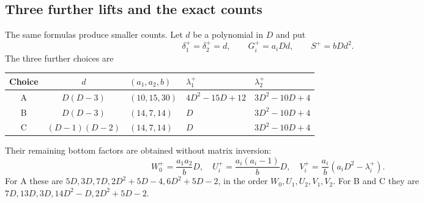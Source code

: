 \subsection{Three further lifts and the exact counts}\label{sec:searched-lifts}
The same formulas produce smaller counts. Let $d$ be a polynomial in $D$ and put
\[
 \delta_1^+=\delta_2^+=d,\qquad G_i^+=a_iDd,\qquad S^+=bDd^2.
\]
The three further choices are
\begin{center}
\begin{tabular}{cclll}
\toprule
Choice & $d$ & $(a_1,a_2,b)$ & $\lambda_1^+$ & $\lambda_2^+$\\
\midrule
A & $D(D-3)$ & $(10,15,30)$ & $4D^2-15D+12$ & $3D^2-10D+4$\\
B & $D(D-3)$ & $(14,7,14)$ & $D$ & $3D^2-10D+4$\\
C & $(D-1)(D-2)$ & $(14,7,14)$ & $D$ & $3D^2-10D+4$\\
\bottomrule
\end{tabular}
\end{center}
Their remaining bottom factors are obtained without matrix inversion:
\[
 W_0^+=\frac{a_1a_2}{b}D,\quad
 U_i^+=\frac{a_i(a_i-1)}bD,\quad
 V_i^+=\frac{a_i}{b}(a_iD^2-\lambda_i^+).
\]
For A these are $5D,3D,7D,2D^2+5D-4,6D^2+5D-2$, in the order $W_0,U_1,U_2,V_1,V_2$. For B and C they are $7D,13D,3D,14D^2-D,2D^2+5D-2$.

